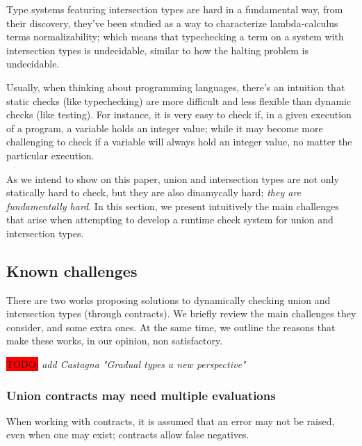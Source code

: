 \newcommand{\TODO}[1]{\colorbox{red}{TODO:} \textit{#1}}
\newcommand{\moral}[1]{\noindent $\hookrightarrow$ \textsc{#1}}

Type systems featuring intersection types are hard in a fundamental way,
from their discovery, they've been studied as a way to characterize
lambda-calculus terms normalizability; which means that typechecking a
term on a system with intersection types is undecidable,
similar to how the halting problem is undecidable.

Usually, when thinking about programming languages, there's an intuition
that static checks (like typechecking) are more difficult and less flexible
than dynamic checks (like testing). For instance, it is very easy to check if,
in a given execution of a program, a variable holds an integer value; while it
may become more challenging to check if a variable will always hold an integer value,
no matter the particular execution.

As we intend to show on this paper, union and intersection types are not only
statically hard to check, but they are also dinamycally hard;
\textit{they are fundamentally hard}.
In this section, we present intuitively the main challenges that arise
when attempting to develop a runtime check system for union and intersection types.

\subsection{Known challenges}

There are two works proposing solutions to dynamically checking union and intersection
types (through contracts). 
We briefly review the main challenges they consider, and some extra ones.
At the same time, we outline the reasons that make these works,
in our opinion, non satisfactory.

\TODO{add Castagna "Gradual types a new perspective"}

\subsubsection*{Union contracts may need multiple evaluations}

When working with contracts, it is assumed that an error may not be raised, even
when one may exist; contracts allow false negatives.


